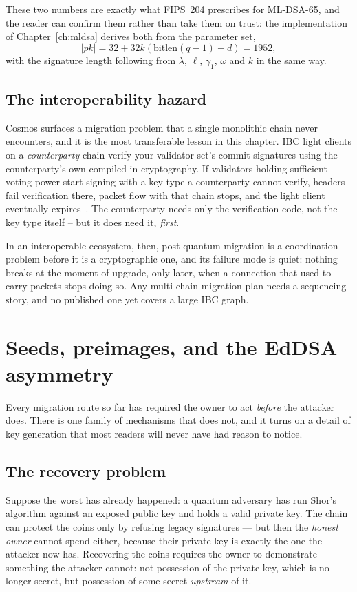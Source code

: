 These two numbers are exactly what FIPS~204 prescribes for ML-DSA-65, and the
reader can confirm them rather than take them on trust: the implementation of
Chapter~\ref{ch:mldsa} derives both from the parameter set,
\[
|pk| = 32 + 32k(\mathrm{bitlen}(q-1) - d) = 1952,
\]
with the signature length following from $\lambda$, $\ell$, $\gamma_1$, $\omega$
and $k$ in the same way.

\subsection{The interoperability hazard}
Cosmos surfaces a migration problem that a single monolithic chain never
encounters, and it is the most transferable lesson in this chapter. IBC light
clients on a \emph{counterparty} chain verify your validator set's commit
signatures using the counterparty's own compiled-in cryptography. If validators
holding sufficient voting power start signing with a key type a counterparty
cannot verify, headers fail verification there, packet flow with that chain
stops, and the light client eventually expires~\cite{cosmossdkpq}. The
counterparty needs only the verification code, not the key type itself -- but it
does need it, \emph{first}.

In an interoperable ecosystem, then, post-quantum migration is a coordination
problem before it is a cryptographic one, and its failure mode is quiet: nothing
breaks at the moment of upgrade, only later, when a connection that used to
carry packets stops doing so. Any multi-chain migration plan needs a sequencing
story, and no published one yet covers a large IBC graph.


\section{Seeds, preimages, and the EdDSA asymmetry}
\label{sec:eddsa-asymmetry}

Every migration route so far has required the owner to act \emph{before} the
attacker does. There is one family of mechanisms that does not, and it turns on a
detail of key generation that most readers will never have had reason to notice.

\subsection{The recovery problem}
Suppose the worst has already happened: a quantum adversary has run Shor's
algorithm against an exposed public key and holds a valid private key. The chain
can protect the coins only by refusing legacy signatures --- but then the
\emph{honest owner} cannot spend either, because their private key is exactly the
one the attacker now has. Recovering the coins requires the owner to demonstrate
something the attacker cannot: not possession of the private key, which is no
longer secret, but possession of some secret \emph{upstream} of it.

